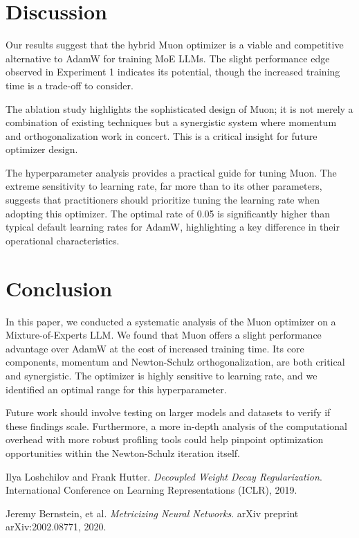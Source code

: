 \documentclass[11pt, a4paper]{article}
\begin{document}
\section{Discussion}
Our results suggest that the hybrid Muon optimizer is a viable and competitive alternative to AdamW for training MoE LLMs. The slight performance edge observed in Experiment 1 indicates its potential, though the increased training time is a trade-off to consider.

The ablation study highlights the sophisticated design of Muon; it is not merely a combination of existing techniques but a synergistic system where momentum and orthogonalization work in concert. This is a critical insight for future optimizer design.

The hyperparameter analysis provides a practical guide for tuning Muon. The extreme sensitivity to learning rate, far more than to its other parameters, suggests that practitioners should prioritize tuning the learning rate when adopting this optimizer. The optimal rate of 0.05 is significantly higher than typical default learning rates for AdamW, highlighting a key difference in their operational characteristics.

\section{Conclusion}
In this paper, we conducted a systematic analysis of the Muon optimizer on a Mixture-of-Experts LLM. We found that Muon offers a slight performance advantage over AdamW at the cost of increased training time. Its core components, momentum and Newton-Schulz orthogonalization, are both critical and synergistic. The optimizer is highly sensitive to learning rate, and we identified an optimal range for this hyperparameter.

Future work should involve testing on larger models and datasets to verify if these findings scale. Furthermore, a more in-depth analysis of the computational overhead with more robust profiling tools could help pinpoint optimization opportunities within the Newton-Schulz iteration itself.

\begin{thebibliography}{9}
Ilya Loshchilov and Frank Hutter.
\textit{Decoupled Weight Decay Regularization}.
International Conference on Learning Representations (ICLR), 2019.

Jeremy Bernstein, et al.
\textit{Metricizing Neural Networks}.
arXiv preprint arXiv:2002.08771, 2020.

\end{thebibliography}
\end{document}
